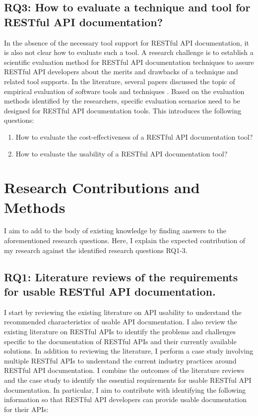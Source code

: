 \documentclass[11pt,oneside]{book}
\begin{document}
\section{RQ3: How to evaluate a technique and tool for RESTful API documentation?}

In the absence of the necessary tool support for RESTful API documentation, it is also not clear how to evaluate such a tool. A research challenge is to establish a scientific evaluation method for RESTful API documentation techniques to assure RESTful API developers about the merits and drawbacks of a technique and related tool supports. In the literature, several papers discussed the topic of empirical evaluation of software tools and techniques \cite{runeson2009guidelines,sjoberg2002conducting,lethbridge2005studying,kitchenham2008evaluating,easterbrook2008selecting}. Based on the evaluation methods identified by the researchers, specific evaluation scenarios need to be designed for RESTful API documentation tools. This introduces the following questions:

\begin{enumerate}
\item How to evaluate the cost-effectiveness of a RESTful API documentation tool?
\item How to evaluate the usability of a RESTful API documentation tool?
\end{enumerate}


\chapter{Research Contributions and Methods}

I aim to add to the body of existing knowledge by finding answers to the aforementioned research questions. Here, I explain the expected contribution of my research against the identified research questions RQ1-3.

\section{RQ1: Literature reviews of the requirements for usable RESTful API documentation.}

I start by reviewing the existing literature on API usability to understand the recommended characteristics of usable API documentation. I also review the existing literature on RESTful APIs to identify the problems and challenges specific to the documentation of RESTful APIs and their currently available solutions. In addition to reviewing the literature, I perform a case study involving multiple RESTful APIs to understand the current industry practices around RESTful API documentation. I combine the outcomes of the literature reviews and the case study to identify the essential requirements for usable RESTful API documentation. In particular, I aim to contribute with identifying the following information so that RESTful API developers can provide usable documentation for their APIs:
\end{document}
